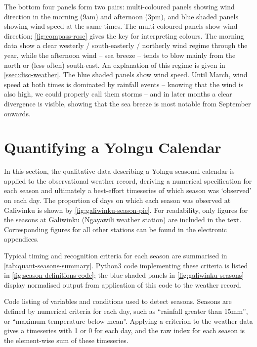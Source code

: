 \begin{framedbox}
    The bottom four panels form two pairs: multi-coloured panels showing wind
    direction in the morning (9am) and afternoon (3pm), and blue shaded
    panels showing wind speed at the same times.
    The multi-coloured panels show wind direction; \cref{fig:compass-rose} gives
    the key for interpreting colours.  The morning data show a clear westerly /
    south-easterly / northerly wind regime through the year, while the afternoon
    wind -- sea breeze -- tends to blow mainly from the north or (less often)
    south-east.  An explanation of this regime is given in \cref{ssec:disc-weather}.
    The blue shaded panels show wind speed.  Until March, wind speed at
    both times is dominated by rainfall events -- knowing that the wind is also
    high, we could properly call them storms -- and in later months a clear
    divergence is visible, showing that the sea breeze is most notable from
    September onwards.
\end{framedbox}

\checkoddpage\ifoddpage\else\ObservationMultipanels\fi


\section{Quantifying a Yolngu Calendar}
\label{sec:applying-seasons-method}

In this section, the qualitative data describing a Yolngu seasonal
calendar is applied to the observational weather record, deriving
a numerical specification for each season and ultimately a best-effort
timeseries of which season was `observed' on each day.  The proportion
of days on which each season was observed at Galiwinku is shown by
\cref{fig:galiwinku-season-pie}.
%
For readability, only figures for the seasons at Galiwinku
(Ngayawili weather station) are included in the text.  Corresponding
figures for all other stations can be found in the electronic appendices.

Typical timing and recognition criteria for each season are summarised in
\cref{tab:quant-seasons-summary}.  Python3 code implementing these criteria
is listed in \cref{fig:season-definitions-code}; the blue-shaded panels in
\cref{fig:galiwinku-seasons} display normalised output from application of
this code to the weather record.

\begin{framedbox}
    \centering
    \caption[Python code: definition of season indices]{
        Code listing of variables and conditions used to detect seasons.
        Seasons are defined by numerical criteria for each day, such as
        ``rainfall greater than 15mm'', or ``maximum temperature below mean''.
        Applying a criterion to the weather data gives a timeseries with 1 or 0
        for each day, and the raw index for each season is the element-wise
        sum of these timeseries.}
    \label{fig:season-definitions-code}
    
\end{framedbox}


